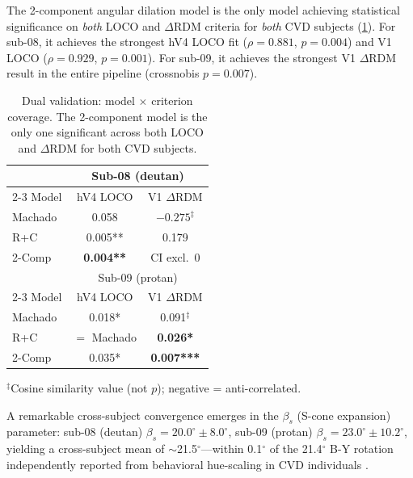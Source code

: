 \documentclass{article}
\begin{document}
The 2-component angular dilation model is the only model achieving statistical significance on \emph{both} LOCO and $\Delta$RDM criteria for \emph{both} CVD subjects (\cref{tab:dual}).
For sub-08, it achieves the strongest hV4 LOCO fit ($\rho = 0.881$, $p = 0.004$) and V1 LOCO ($\rho = 0.929$, $p = 0.001$).
For sub-09, it achieves the strongest V1 $\Delta$RDM result in the entire pipeline (crossnobis $p = 0.007$).

\begin{table}[t]
  \caption{Dual validation: model $\times$ criterion coverage. The 2-component model is the only one significant across both LOCO and $\Delta$RDM for both CVD subjects.}
  \label{tab:dual}
  \begin{center}
    \begin{small}
      \begin{tabular}{lcc}
        \toprule
        & \multicolumn{2}{c}{Sub-08 (deutan)} \\
        \cmidrule(lr){2-3}
        Model & hV4 LOCO & V1 $\Delta$RDM \\
        \midrule
        Machado    & 0.058        & $-0.275^\ddagger$ \\
        R+C        & 0.005**      & 0.179      \\
        2-Comp     & \textbf{0.004**}  & CI excl.\ 0 \\
        \midrule
        & \multicolumn{2}{c}{Sub-09 (protan)} \\
        \cmidrule(lr){2-3}
        Model & hV4 LOCO & V1 $\Delta$RDM \\
        \midrule
        Machado    & 0.018*       & 0.091$^\ddagger$ \\
        R+C        & $=$ Machado  & \textbf{0.026*} \\
        2-Comp     & 0.035*       & \textbf{0.007***} \\
        \bottomrule
      \end{tabular}
    \end{small}
  \end{center}
  {\footnotesize $^\ddagger$Cosine similarity value (not $p$); negative = anti-correlated.}
  \vskip -0.1in
\end{table}

A remarkable cross-subject convergence emerges in the $\beta_s$ (S-cone expansion) parameter: sub-08 (deutan) $\beta_s = 20.0^\circ \pm 8.0^\circ$, sub-09 (protan) $\beta_s = 23.0^\circ \pm 10.2^\circ$, yielding a cross-subject mean of $\sim$21.5$^\circ$---within 0.1$^\circ$ of the 21.4$^\circ$ B-Y rotation independently reported from behavioral hue-scaling in CVD individuals \cite{placeholder_emery2021}.
\end{document}
